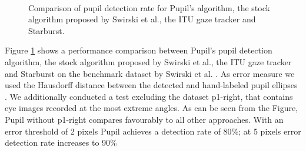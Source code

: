 \documentclass[12pt,fleqn]{book} %
\begin{document}
\begin{figure}[]
\begin{dBox}
\centering
  \mbox{
   }
   \caption{Comparison of pupil detection rate for Pupil’s algorithm, the stock algorithm proposed by Swirski et al., the ITU gaze tracker and Starburst.
 \label{fig:Pupil_Performance} }   
\end{dBox}   
\end{figure}

Figure \ref{fig:Pupil_Performance} shows a performance comparison between Pupil’s pupil detection algorithm, the stock algorithm proposed by Swirski et al., the ITU gaze tracker and Starburst on the benchmark dataset by Swirski et al. \cite{swirski}. As error measure we used the Hausdorff distance between the detected and hand-labeled pupil ellipses \cite{swirski}. We additionally conducted a test excluding the dataset p1-right, that contains eye images recorded at the most extreme angles.
As can be seen from the Figure, Pupil without p1-right compares favourably to all other approaches. With an error threshold of 2 pixels Pupil achieves a detection rate of 80\%; at 5 pixels error detection rate increases to 90\%
\end{document}
